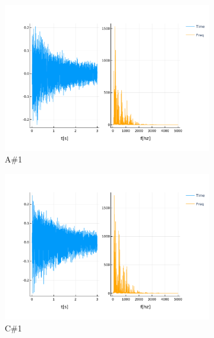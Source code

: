\documentclass[12pt]{article}
\begin{document}
\begin{figure}[!ht]
	\centering
	\begin{subfigure}{.5\textwidth}
		\centering
		\includegraphics[width=1.0\linewidth]{assets/A1_sos.pdf}
		\caption{A\#1}
		\label{fig:a1_sos}
	\end{subfigure}%
	\begin{subfigure}{.5\textwidth}
		\centering
		\includegraphics[width=1.0\linewidth]{assets/C1_sos.pdf}
		\caption{C\#1}
		\label{fig:c1_sos}
	\end{subfigure}
	\caption{}
\end{figure}
\end{document}

